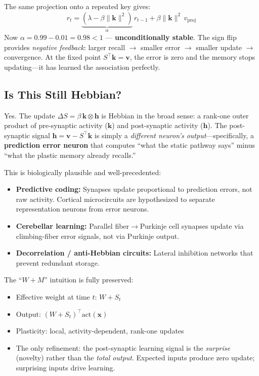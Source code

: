 \documentclass[11pt,a4paper]{article}
\begin{document}
The same projection onto a repeated key gives:
\begin{equation}
r_t = \underbrace{(\lambda - \beta \|\mathbf{k}\|^2)}_{\alpha} \, r_{t-1} + \beta \|\mathbf{k}\|^2 \, v_{\text{proj}}
\end{equation}
Now $\alpha = 0.99 - 0.01 = 0.98 < 1$ --- \textbf{unconditionally stable}.
The sign flip provides \emph{negative feedback}: larger recall $\to$ smaller error $\to$ smaller update $\to$ convergence.
At the fixed point $S^\top \mathbf{k} = \mathbf{v}$, the error is zero and the memory stops updating---it has learned the association perfectly.

\subsection{Is This Still Hebbian?}

Yes. The update $\Delta S = \beta \, \mathbf{k} \otimes \mathbf{h}$ is Hebbian in the broad sense: a rank-one outer product of pre-synaptic activity ($\mathbf{k}$) and post-synaptic activity ($\mathbf{h}$).
The post-synaptic signal $\mathbf{h} = \mathbf{v} - S^\top\mathbf{k}$ is simply a \emph{different neuron's output}---specifically, a \textbf{prediction error neuron} that computes ``what the static pathway says'' minus ``what the plastic memory already recalls.''

This is biologically plausible and well-precedented:
\begin{itemize}
\item \textbf{Predictive coding:} Synapses update proportional to prediction errors, not raw activity. Cortical microcircuits are hypothesized to separate representation neurons from error neurons.
\item \textbf{Cerebellar learning:} Parallel fiber$\to$Purkinje cell synapses update via climbing-fiber error signals, not via Purkinje output.
\item \textbf{Decorrelation / anti-Hebbian circuits:} Lateral inhibition networks that prevent redundant storage.
\end{itemize}

The ``$W + M$'' intuition is fully preserved:
\begin{itemize}
\item Effective weight at time $t$: $W + S_t$ \checkmark
\item Output: $(W + S_t)^\top \text{act}(\mathbf{x})$ \checkmark
\item Plasticity: local, activity-dependent, rank-one updates \checkmark
\item The only refinement: the post-synaptic learning signal is the \emph{surprise} (novelty) rather than the \emph{total output}.
Expected inputs produce zero update; surprising inputs drive learning.
\end{itemize}
\end{document}
